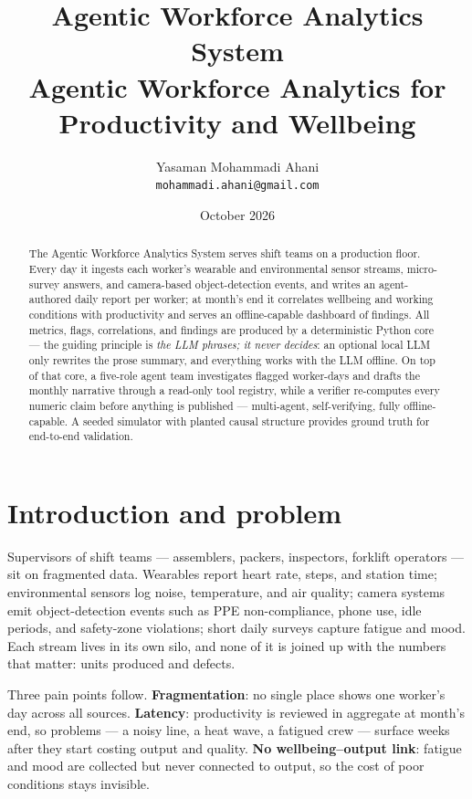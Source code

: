 \documentclass[11pt,a4paper]{article}
\title{\textcolor{slblue}{\textbf{Agentic Workforce Analytics System}}\\[2pt]
\large Agentic Workforce Analytics for Productivity and Wellbeing}
\author{Yasaman Mohammadi Ahani\\[1pt] \normalsize\texttt{mohammadi.ahani@gmail.com}}
\date{October 2026}
\begin{document}
\maketitle

\begin{abstract}
\noindent
The Agentic Workforce Analytics System serves shift teams on a
production floor. Every day it ingests each worker's wearable and
environmental sensor streams, micro-survey answers, and camera-based
object-detection events, and writes an agent-authored daily report per
worker; at month's end it correlates wellbeing and working conditions with
productivity and serves an offline-capable dashboard of findings. All
metrics, flags, correlations, and findings are produced by a deterministic
Python core --- the guiding principle is \emph{the LLM phrases; it never
decides}: an optional local LLM only rewrites the prose summary, and
everything works with the LLM offline. On top of that core, a five-role agent team
investigates flagged worker-days and drafts the monthly narrative through
a read-only tool registry, while a verifier re-computes every numeric
claim before anything is published --- multi-agent, self-verifying, fully
offline-capable. A seeded simulator with
planted causal structure provides ground truth for end-to-end validation.
\end{abstract}

\section{Introduction and problem}
Supervisors of shift teams --- assemblers, packers, inspectors, forklift
operators --- sit on fragmented data. Wearables report heart rate, steps,
and station time; environmental sensors log noise, temperature, and air
quality; camera systems emit object-detection events such as PPE
non-compliance, phone use, idle periods, and safety-zone violations; short
daily surveys capture fatigue and mood. Each stream lives in its own silo,
and none of it is joined up with the numbers that matter: units produced
and defects.

Three pain points follow. \textbf{Fragmentation}: no single place shows one
worker's day across all sources. \textbf{Latency}: productivity is reviewed
in aggregate at month's end, so problems --- a noisy line, a heat wave, a
fatigued crew --- surface weeks after they start costing output and
quality. \textbf{No wellbeing--output link}: fatigue and mood are collected
but never connected to output, so the cost of poor conditions stays
invisible.
\end{document}
